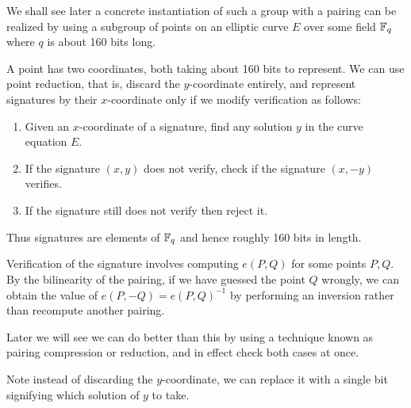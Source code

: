 We shall see later
a concrete instantiation of such a group with a pairing
can be realized by using a subgroup of points
on an elliptic curve $E$ over some field $\mathbb{F}_q$ where
$q$ is about 160 bits long.

A point has two coordinates, both taking about 160 bits to represent.
We can use point reduction, that is, discard the $y$-coordinate entirely,
and represent signatures by their $x$-coordinate only if we modify
verification as follows:
\begin{enumerate}
\item
Given an $x$-coordinate of a signature, find any solution $y$
in the curve equation $E$.
\item
If the signature $(x,y)$ does not verify,
check if the signature $(x, -y)$ verifies.
\item
If the signature still does not verify then reject it.
\end{enumerate}

Thus signatures are elements of $\mathbb{F}_q$ and hence roughly 160 bits in length.

Verification of the signature involves computing $e(P, Q)$ for some points
$P, Q$. By the bilinearity of the pairing, if we have guessed the point $Q$
wrongly, we can obtain the value of $e(P,-Q) = e(P,Q)^{-1}$ by performing
an inversion rather than recompute another pairing.

Later we will see we can do better than this by using a technique known
as pairing compression or reduction, and in effect check both
cases at once.

Note instead of discarding the $y$-coordinate, we can
replace it with a single bit signifying which solution of $y$ to take.

